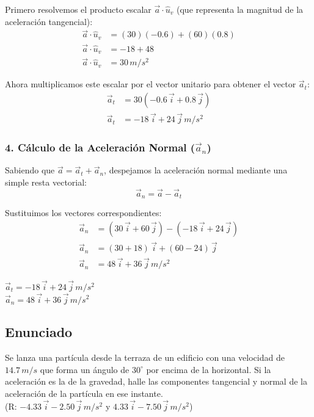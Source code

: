 \documentclass[12pt, a4paper]{article}
\begin{document}
Primero resolvemos el producto escalar $\vec{a} \cdot \hat{u}_v$ (que representa la magnitud de la aceleración tangencial):
\begin{align*}
    \vec{a} \cdot \hat{u}_v &= (30)(-0.6) + (60)(0.8) \\
    \vec{a} \cdot \hat{u}_v &= -18 + 48 \\
    \vec{a} \cdot \hat{u}_v &= 30 \, \si{m/s^2}
\end{align*}

Ahora multiplicamos este escalar por el vector unitario para obtener el vector $\vec{a}_t$:
\begin{align*}
    \vec{a}_t &= 30 (-0.6 \, \vec{i} + 0.8 \, \vec{j}) \\
    \vec{a}_t &= -18 \, \vec{i} + 24 \, \vec{j} \, \si{m/s^2}
\end{align*}

\subsubsection*{4. Cálculo de la Aceleración Normal ($\vec{a}_n$)}
Sabiendo que $\vec{a} = \vec{a}_t + \vec{a}_n$, despejamos la aceleración normal mediante una simple resta vectorial:
$$ \vec{a}_n = \vec{a} - \vec{a}_t $$

Sustituimos los vectores correspondientes:
\begin{align*}
    \vec{a}_n &= (30 \, \vec{i} + 60 \, \vec{j}) - (-18 \, \vec{i} + 24 \, \vec{j}) \\
    \vec{a}_n &= (30 + 18) \, \vec{i} + (60 - 24) \, \vec{j} \\
    \vec{a}_n &= 48 \, \vec{i} + 36 \, \vec{j} \, \si{m/s^2}
\end{align*}

\begin{tcolorbox}[colback=green!5!white, colframe=green!50!black, title=Respuesta Final]
\centering 
$\vec{a}_t = -18 \, \vec{i} + 24 \, \vec{j} \, \si{m/s^2}$ \\
\vspace{0.2cm}
$\vec{a}_n = 48 \, \vec{i} + 36 \, \vec{j} \, \si{m/s^2}$
\end{tcolorbox}

\newpage

\subsection*{Enunciado}
Se lanza una partícula desde la terraza de un edificio con una velocidad de $14.7 \, \si{m/s}$ que forma un ángulo de $30^\circ$ por encima de la horizontal. Si la aceleración es la de la gravedad, halle las componentes tangencial y normal de la aceleración de la partícula en ese instante. \\
(R: $-4.33 \, \vec{i} - 2.50 \, \vec{j} \, \si{m/s^2}$ y $4.33 \, \vec{i} - 7.50 \, \vec{j} \, \si{m/s^2}$)
\end{document}
